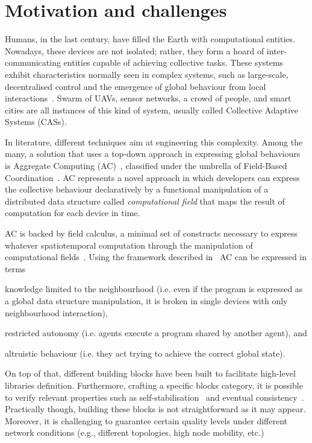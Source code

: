 \documentclass[conference]{IEEEtran}
\begin{document}
\section{Motivation and challenges}
Humans, in the last century, have filled the Earth with computational entities. 
%
%
Nowadays, these devices are not isolated; rather, they form a hoard of inter-communicating entities capable of achieving collective tasks.
% 
These systems exhibit characteristics normally seen in complex systems, such as large-scale, decentralised control and the emergence of global behaviour from local interactions~\cite{DBLP:conf/huc/Ferscha15}.
% 
Swarm of UAVs, sensor networks, a crowd of people, and smart cities are all instances of this kind of system, usually called Collective Adaptive Systems (CASs).

In literature, different techniques aim at engineering this complexity.
%
Among the many, a solution that uses a top-down approach in expressing global behaviours is Aggregate Computing (AC)~\cite{DBLP:journals/computer/BealPV15}, classified under the umbrella of Field-Based Coordination~\cite{DBLP:books/daglib/0015276}.
%
AC represents a novel approach in which developers can express the collective behaviour declaratively by a functional manipulation of a distributed data structure called \emph{computational field} that maps the result of computation for each device in time.

AC is backed by field calculus, a minimal set of constructs necessary to express whatever spatiotemporal computation through the manipulation of computational fields~\cite{DBLP:conf/coordination/AudritoBDV18}. 
%
Using the framework described in~\cite{DAngelo2019} AC can be expressed in terms 
\begin{enumerate*}[label=(\roman*)]
    \item knowledge limited to the neighbourhood  (i.e. even if the program is expressed as a global data structure manipulation, it is broken in single devices with only neighbourhood interaction), 
    \item restricted autonomy (i.e. agents execute a program shared by another agent), and 
    \item altruistic behaviour (i.e. they act trying to achieve the correct global state).
\end{enumerate*}

%
On top of that, different building blocks have been built to facilitate high-level libraries definition.
%
Furthermore, crafting a specific blocks category, it is possible to verify relevant properties such as self-stabilisation~\cite{DBLP:conf/coordination/ViroliD14} and eventual consistency~\cite{DBLP:conf/saso/BealVPD16}.
%
Practically though, building these blocks is not straightforward as it may appear. 
%
Moreover, it is challenging to guarantee certain quality levels under different network conditions (e.g., different topologies, high node mobility, etc.)
\end{document}
